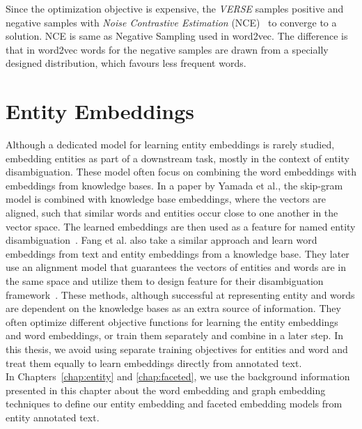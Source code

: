 Since the optimization objective is expensive, the \emph{VERSE} samples positive and negative samples with \emph{Noise Contrastive Estimation} (NCE)~ to converge to a solution. NCE is same as Negative Sampling used in word2vec. The difference is that in word2vec words for the negative samples are drawn from a specially designed distribution, which favours less frequent words. 

\section{Entity Embeddings}
\label{sec:enity_embed}
Although a dedicated model for learning entity embeddings is rarely studied, embedding entities as part of a downstream task, mostly in the context of entity disambiguation. These model often focus on combining the word embeddings with embeddings from knowledge bases. In a paper by Yamada et al., the skip-gram model is combined with knowledge base embeddings, where the vectors are aligned, such that similar words and entities occur close to one another in the vector space. The learned embeddings are then used as a feature for named entity disambiguation~. Fang et al. also take a similar approach and learn word embeddings from text and entity embeddings from a knowledge base. They later use an alignment model that guarantees the vectors of entities and words are in the same space and utilize them to design feature for their disambiguation framework~. These methods, although successful at representing entity and words are dependent on the knowledge bases as an extra source of information. They often optimize different objective functions for learning the entity embeddings and word embeddings, or train them separately and combine in a later step. In this thesis, we avoid using separate training objectives for entities and word and treat them equally to learn embeddings directly from annotated text.\\

In Chapters~\ref{chap:entity} and \ref{chap:faceted}, we use the background information presented in this chapter about the word embedding and graph embedding techniques to define our entity embedding and faceted embedding models from entity annotated text.
